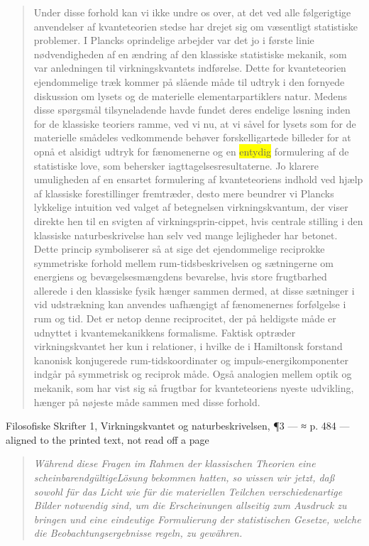 \documentclass[11pt]{article}
\newcommand{\dcite}[1]{{\nopagebreak\raggedleft\small #1\par}\medskip}
\newcommand{\tlg}[1]{{\setlength{\fboxsep}{0.8pt}\colorbox{yellow}{#1}}}
\newcommand{\olg}[1]{{\setlength{\fboxsep}{0.8pt}\colorbox{cyan!25}{#1}}}
\begin{document}
\begin{quote}
Under disse forhold kan vi ikke undre os over, at det ved alle følgerigtige anvendelser af kvanteteorien stedse har drejet sig om væsentligt statistiske problemer. I Plancks oprindelige arbejder var det jo i første linie nødvendigheden af en ændring af den klassiske statistiske mekanik, som var anledningen til virkningskvantets indførelse. Dette for kvanteteorien ejendommelige træk kommer på slående måde til udtryk i den fornyede diskussion om lysets og de materielle elementarpartiklers natur. Medens disse spørgsmål tilsyneladende havde fundet deres endelige løsning inden for de klassiske teoriers ramme, ved vi nu, at vi såvel for lysets som for de materielle smådeles vedkommende behøver forskelligartede billeder for at opnå et alsidigt udtryk for fænomenerne og en \tlg{entydig} formulering af de statistiske love, som behersker iagttagelsesresultaterne. Jo klarere umuligheden af en ensartet formulering af kvanteteoriens indhold ved hjælp af klassiske forestillinger fremtræder, desto mere beundrer vi Plancks lykkelige intuition ved valget af betegnelsen virkningskvantum, der viser direkte hen til en svigten af virkningsprin-cippet, hvis centrale stilling i den klassiske naturbeskrivelse han selv ved mange lejligheder har betonet. Dette princip symboliserer så at sige det ejendommelige reciprokke symmetriske forhold mellem rum-tidsbeskrivelsen og sætningerne om energiens og bevægelsesmængdens bevarelse, hvis store frugtbarhed allerede i den klassiske fysik hænger sammen dermed, at disse sætninger i vid udstrækning kan anvendes uafhængigt af fænomenernes forfølgelse i rum og tid. Det er netop denne reciprocitet, der på heldigste måde er udnyttet i kvantemekanikkens formalisme. Faktisk optræder virkningskvantet her kun i relationer, i hvilke de i Hamiltonsk forstand kanonisk konjugerede rum-tidskoordinater og impuls-energikomponenter indgår på symmetrisk og reciprok måde. Også analogien mellem optik og mekanik, som har vist sig så frugtbar for kvanteteoriens nyeste udvikling, hænger på nøjeste måde sammen med disse forhold.
\end{quote}
\dcite{Filosofiske Skrifter 1, Virkningskvantet og naturbeskrivelsen, ¶3 — ≈ p. 484 — aligned to the printed text, not read off a page}
{\footnotesize\begin{quote}\itshape
Während diese Fragen im Rahmen der klassischen Theorien eine scheinbarendgültigeLösung bekommen hatten, so wissen wir jetzt, daß sowohl für das Licht wie für die materiellen Teilchen verschiedenartige Bilder notwendig sind, um die Erscheinungen allseitig zum Ausdruck zu bringen und eine \olg{eindeutige} Formulierung der statistischen Gesetze, welche die Beobachtungsergebnisse regeln, zu gewähren.
\end{quote}}
\end{document}
